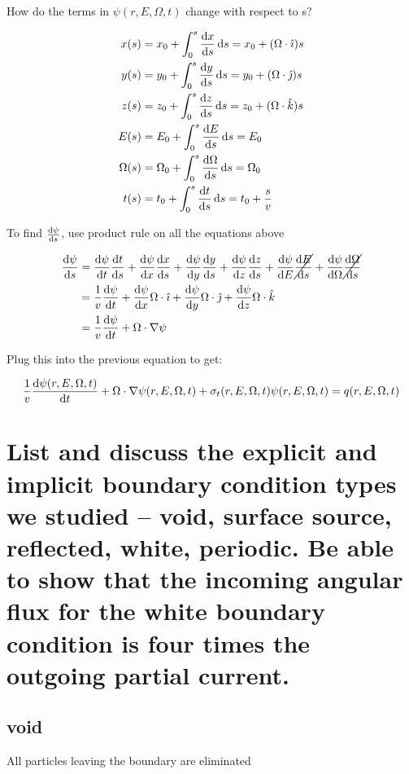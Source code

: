 \documentclass{article}
\begin{document}
How do the terms in $\psi(r, E, \Omega, t)$ change with respect to s?

\begin{align*}
	x(s) &= x_0 + \int_0^s \dv{x}{s} \dd{s} = x_0 + (\Omega \cdot \hat{\imath}) s \\
	y(s) &= y_0 + \int_0^s \dv{y}{s} \dd{s} = y_0 + (\Omega \cdot \hat{\jmath}) s \\
	z(s) &= z_0 + \int_0^s \dv{z}{s} \dd{s} = z_0 + (\Omega \cdot \hat{k}) s \\
	E(s) &= E_0 + \int_0^s \dv{E}{s} \dd{s} = E_0 \\
	\Omega(s) &= \Omega_0 + \int_0^s \dv{\Omega}{s} \dd{s} = \Omega_0 \\
	t(s) &= t_0 + \int_0^s \dv{t}{s} \dd{s} = t_0 + \frac{s}{v}
\end{align*}

To find $\dv{\psi}{s}$, use product rule on all the equations above

\begin{align*}
	\dv{\psi}{s} &= \dv{\psi}{t} \dv{t}{s} + \dv{\psi}{x} \dv{x}{s} + \dv{\psi}{y} \dv{y}{s} + \dv{\psi}{z} \dv{z}{s} + \dv{\psi}{E} \cancel{\dv{E}{s}} + \dv{\psi}{\Omega} \cancel{\dv{\Omega}{s}} \\
	&= \frac{1}{v} \dv{\psi}{t} + \dv{\psi}{x} \Omega \cdot \hat{\imath} + \dv{\psi}{y} \Omega \cdot \hat{\jmath} + \dv{\psi}{z} \Omega \cdot \hat{k} \\
	&= \frac{1}{v} \dv{\psi}{t} + \Omega \cdot \nabla \psi
\end{align*}

Plug this into the previous equation to get:

\begin{align*}
	\frac{1}{v} \dv{\psi(r, E, \Omega, t)}{t} + \Omega \cdot \nabla \psi(r, E, \Omega, t) + \sigma_t(r, E, \Omega, t) \psi(r, E, \Omega, t) = q(r, E, \Omega, t)
\end{align*}

\newpage
\section{List and discuss the explicit and implicit boundary condition types we studied -- void, surface source, reflected, white, periodic. Be able to show that the incoming angular flux for the white boundary condition is four times the outgoing partial current.}

\subsection{void}
All particles leaving the boundary are eliminated
\end{document}
